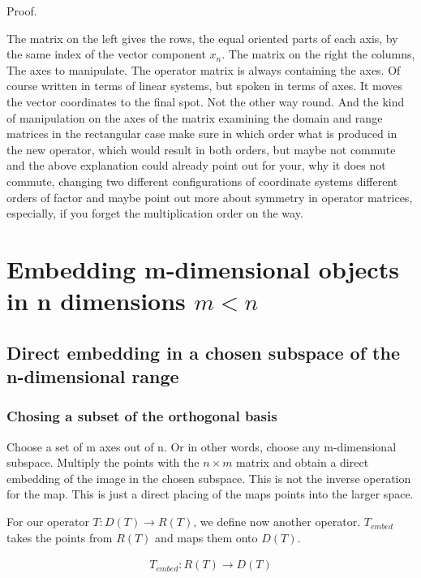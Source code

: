 \documentclass[a4paper]{article}
\begin{document}
Proof. 

The matrix on the left gives the rows, the equal oriented parts of each axis, by the same index of the vector component $x_n$.
The matrix on the right the columns, The axes to manipulate. 
The operator matrix is always containing the axes. Of course written in terms of linear systems, but spoken in terms of axes.
It moves the vector coordinates to the final spot. Not the other way round. And the kind of manipulation on the axes of the matrix
examining the domain and range matrices in the rectangular case make sure in which order what is produced in the new operator, which would result in both orders, but maybe not commute and the above explanation could already point out for your, why it does not commute, changing two different configurations of coordinate systems different orders of factor and maybe point out more about symmetry in operator matrices, especially, if you forget the multiplication order on the way. 






\section{Embedding m-dimensional objects in n dimensions $m \lt n$}

\subsection{Direct embedding in a chosen subspace of the n-dimensional range}


\subsubsection{Chosing a subset of the orthogonal basis}

Choose a set of m axes out of n. Or in other words, choose any m-dimensional subspace.
Multiply the points with the $n \times m$ matrix and obtain a direct embedding of the image in the chosen subspace.
This is not the inverse operation for the map. This is just a direct placing of the maps points into the larger space.

For our operator $T : D(T) \rightarrow R(T)$, we define now another operator. $T_{embed}$ takes the points from $R(T)$ and maps them onto $D(T)$.

\begin{displaymath}
\begin{align}
	T_{embed} : R(T) \rightarrow D(T)
\end{align}
\end{displaymath}
\end{document}
